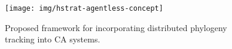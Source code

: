 \begin{figure}
\texttt{[image: img/hstrat-agentless-concept]}
\caption{Proposed framework for incorporating distributed phylogeny tracking into CA systems.}
\label{fig:hstrat-agentless-concept}
\end{figure}
